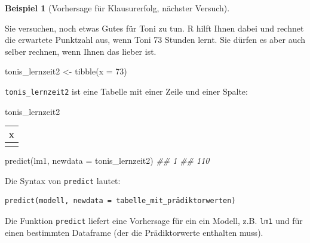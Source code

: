 \documentclass[
  letterpaper,
  oneside,
  open=any]{scrbook}
\newenvironment{Shaded}{\begin{snugshade}}{\end{snugshade}}
\newcommand{\AttributeTok}[1]{\textcolor[rgb]{0.40,0.45,0.13}{#1}}
\newcommand{\DecValTok}[1]{\textcolor[rgb]{0.68,0.00,0.00}{#1}}
\newcommand{\DocumentationTok}[1]{\textcolor[rgb]{0.37,0.37,0.37}{\textit{#1}}}
\newcommand{\FunctionTok}[1]{\textcolor[rgb]{0.28,0.35,0.67}{#1}}
\newcommand{\NormalTok}[1]{\textcolor[rgb]{0.00,0.23,0.31}{#1}}
\newcommand{\OtherTok}[1]{\textcolor[rgb]{0.00,0.23,0.31}{#1}}
\theoremstyle{definition}
\theoremstyle{definition}
\newtheorem{example}{Beispiel}[chapter]
\theoremstyle{definition}
\theoremstyle{remark}
\begin{document}
\begin{example}[Vorhersage für Klausurerfolg, nächster
Versuch]\protect\hypertarget{exm-noten6}{}\label{exm-noten6}

Sie versuchen, noch etwas Gutes für Toni zu tun. R hilft Ihnen dabei und
rechnet die erwartete Punktzahl aus, wenn Toni 73 Stunden lernt. Sie
dürfen es aber auch selber rechnen, wenn Ihnen das lieber ist.

\end{example}

\begin{Shaded}
\begin{Highlighting}[]
\NormalTok{tonis\_lernzeit2 }\OtherTok{\textless{}{-}} \FunctionTok{tibble}\NormalTok{(}\AttributeTok{x =} \DecValTok{73}\NormalTok{)  }
\end{Highlighting}
\end{Shaded}

\texttt{tonis\_lernzeit2} ist eine Tabelle mit einer Zeile und einer
Spalte:

\begin{Shaded}
\begin{Highlighting}[]
\NormalTok{tonis\_lernzeit2}
\end{Highlighting}
\end{Shaded}

\begin{longtable}[]{@{}r@{}}
\toprule\noalign{}
x \\
\midrule\noalign{}
\endhead
\bottomrule\noalign{}
\endlastfoot
73 \\
\end{longtable}

\begin{Shaded}
\begin{Highlighting}[]
\FunctionTok{predict}\NormalTok{(lm1, }\AttributeTok{newdata =}\NormalTok{ tonis\_lernzeit2)}
\DocumentationTok{\#\#   1 }
\DocumentationTok{\#\# 110}
\end{Highlighting}
\end{Shaded}

Die Syntax von \texttt{predict} lautet:

\begin{verbatim}
predict(modell, newdata = tabelle_mit_prädiktorwerten)
\end{verbatim}

Die Funktion \texttt{predict} liefert eine Vorhersage für ein ein
Modell, z.B. \texttt{lm1} und für einen bestimmten Dataframe (der die
Prädiktorwerte enthalten muss).
\end{document}

